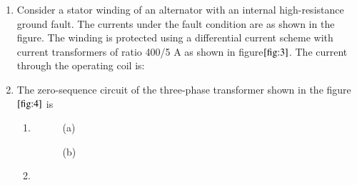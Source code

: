 \documentclass[journal]{IEEEtran}
\numberwithin{equation}{enumi}
\numberwithin{figure}{enumi}
\begin{document}
\begin{enumerate}
    \item Consider a stator winding of an alternator with an internal high-resistance ground fault. The currents under the fault condition are as shown in the figure. The winding is protected using a differential current scheme with current transformers of ratio 400/5 A as shown in figure$\ref{fig:3}$. The current through the operating coil is:
    \begin{figure}[!ht]
			\centering
			
			\caption{}
			\label{fig:3}
	\end{figure}
    \begin{enumerate}
    \end{enumerate}
 \item   The zero-sequence circuit of the three-phase transformer shown in the figure$\ref{fig:4}$ is

\begin{figure}[!ht]
    
			\centering
			
			\caption{}
			\label{fig:4}
		\end{figure}
\begin{enumerate}

    \item[]

    \begin{figure}[H]
        \centering

        \begin{minipage}{0.45\linewidth}
            \centering
            
            \caption*{(a)}
        \end{minipage}%
        \hfill
        \begin{minipage}{0.45\linewidth}
            \centering
            
            \caption*{(b)}
        \end{minipage}

    \end{figure}

    \item[]

    \begin{figure}[H]
        \centering


\end{figure}
\end{enumerate}
\end{enumerate}
\end{document}
